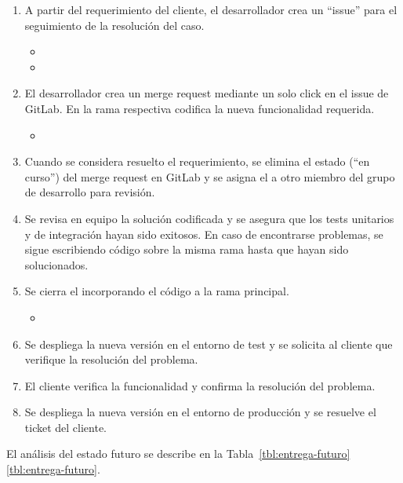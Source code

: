 \begin{enumerate}
\item A partir del requerimiento del cliente, el desarrollador crea un
  ``issue'' para el seguimiento de la resolución del caso.
\begin{itemize}
\item {}
\item {}
\end{itemize}
\item El desarrollador crea un merge request mediante un solo click en
  el issue de GitLab. En la rama respectiva codifica la nueva
  funcionalidad requerida.
\begin{itemize}
\item {}
\end{itemize}
\item Cuando se considera resuelto el requerimiento, se elimina el
  estado  (``en curso'') del merge request en GitLab y se
  asigna el a otro miembro del grupo de desarrollo para revisión.
\item Se revisa en equipo la solución codificada y se asegura que los
  tests unitarios y de integración hayan sido exitosos. En caso de
  encontrarse problemas, se sigue escribiendo código sobre la misma
  rama hasta que hayan sido solucionados.
\item Se cierra el  incorporando el código a la
  rama principal.
\begin{itemize}
\item {}
\end{itemize}
\item Se despliega la nueva versión en el entorno de test y se
  solicita al cliente que verifique la resolución del problema.
\item El cliente verifica la funcionalidad y confirma la resolución
  del problema.
\item Se despliega la nueva versión en el entorno de producción y se
  resuelve el ticket del cliente.
\end{enumerate}
El análisis del estado futuro se describe en la
\iflatexml{}Tabla~\ref{tbl:entrega-futuro}\else\autoref{tbl:entrega-futuro}\fi.

